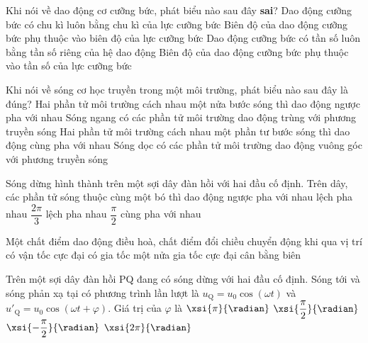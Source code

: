 \begin{ex}
	Khi nói về dao động cơ cưỡng bức, phát biểu nào sau đây \textbf{sai}? 
	\choice
	{Dao động cưỡng bức có chu kì luôn bằng chu kì của lực cưỡng bức }
	{Biên độ của dao động cưỡng bức phụ thuộc vào biên độ của lực cưỡng bức}
	{\True Dao động cưỡng bức có tần số luôn bằng tần số riêng của hệ dao động}
	{Biên độ của dao động cưỡng bức phụ thuộc vào tần số của lực cưỡng bức}
	\loigiai{}
\end{ex}
\begin{ex}
	Khi nói về sóng cơ học truyền trong một môi trường, phát biểu nào sau đây là đúng? 
	\choice
	{\True Hai phần tử môi trường cách nhau một nửa bước sóng thì dao động ngược pha với nhau}
	{Sóng ngang có các phần tử môi trường dao động trùng với phương truyền sóng}
	{Hai phần tử môi trường cách nhau một phần tư bước sóng thì dao động cùng pha với nhau}
	{Sóng dọc có các phần tử môi trường dao động vuông góc với phương truyền sóng}
	\loigiai{}
\end{ex}
\begin{ex}
	Sóng dừng hình thành trên một sợi dây đàn hồi với hai đầu cố định. Trên dây, các phần tử sóng thuộc cùng một bó thì dao động 
	\choice
	{ngược pha với nhau}
	{lệch pha nhau $\dfrac{2\pi}{3}$}
	{lệch pha nhau $\dfrac{\pi}{2}$}
	{\True cùng pha với nhau}
	\loigiai{}
\end{ex}
\begin{ex}
	Một chất điểm dao động điều hoà, chất điểm đổi chiều chuyển động khi qua vị trí
	\choice
	{có vận tốc cực đại}
	{có gia tốc một nửa gia tốc cực đại}
	{cân bằng}
	{\True biên}
	\loigiai{}
\end{ex}
\begin{ex}
	Trên một sợi dây đàn hồi PQ đang có sóng dừng với hai đầu cố định. Sóng tới và sóng phản xạ tại có phương trình lần lượt là $u_{\mathrm{Q}}=u_0\cos\left(\omega t\right)$  và $u'_{\mathrm{Q}}=u_0\cos\left(\omega t+\varphi\right)$. Giá trị của $\varphi$  là 
	\choice
	{\True $\xsi{\pi}{\radian}$}
	{$\xsi{\dfrac{\pi}{2}}{\radian}$}
	{$\xsi{-\dfrac{\pi}{2}}{\radian}$}
	{$\xsi{2\pi}{\radian}$}
	\loigiai{}
\end{ex}
